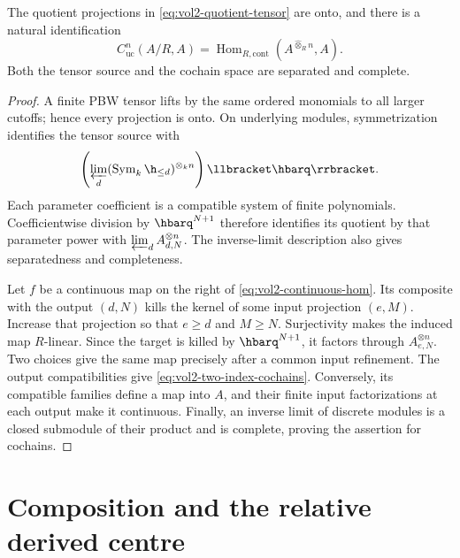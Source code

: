 \begin{lemma}\label{lem:vol2-continuous-maps}
The quotient projections in \eqref{eq:vol2-quotient-tensor} are onto,
and there is a natural identification
\begin{equation}\label{eq:vol2-continuous-hom}
 C^n_{\mathrm{uc}}(A/R,A)
  =\operatorname{Hom}_{R,\mathrm{cont}}
       (A^{\widehat\otimes_R n},A).
\end{equation}
Both the tensor source and the cochain space are separated and complete.
\end{lemma}

\begin{proof}
A finite PBW tensor lifts by the same ordered monomials to all
larger cutoffs; hence every projection is onto. On underlying modules,
symmetrization identifies the tensor source with
\[
 \left(\varprojlim_d
      (\operatorname{Sym}_k\h_{\leq d})^{\otimes_k n}\right)
       \llbracket\hbarq\rrbracket.
\]
Each parameter coefficient is a compatible system of finite
polynomials. Coefficientwise division by $\hbarq^{N+1}$ therefore
identifies its quotient by that parameter power with
$\varprojlim_d A_{d,N}^{\otimes n}$. The inverse-limit description
also gives separatedness and completeness.

Let $f$ be a continuous map on the right of
\eqref{eq:vol2-continuous-hom}. Its composite with the output
$(d,N)$ kills the kernel of some input projection $(e,M)$.
Increase that projection so that $e\geq d$ and $M\geq N$.
Surjectivity makes the induced map $R$-linear. Since the target is
killed by $\hbarq^{N+1}$, it factors through
$A_{e,N}^{\otimes n}$. Two choices give the same map precisely
after a common input refinement. The output compatibilities give
\eqref{eq:vol2-two-index-cochains}.
Conversely, its compatible families define a map into $A$, and their
finite input factorizations at each output make it continuous.
Finally, an inverse limit of discrete modules is a closed submodule
of their product and is complete, proving the assertion for cochains.
\end{proof}

\section{Composition and the relative derived centre}

